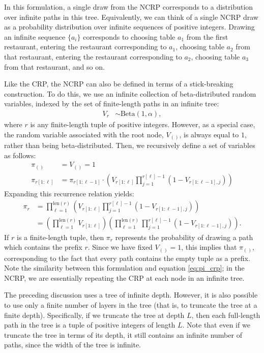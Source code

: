 \documentclass{article}
\newcommand{\len}{\mathrm{len}}
\begin{document}
In this formulation, a single draw from the NCRP corresponds to a distribution over infinite paths in this tree.
Equivalently, we can think of a single NCRP draw as a probability distribution over infinite sequences of positive integers.
Drawing an infinite sequence $\{a_i\}$ corresponds to choosing table $a_1$ from the first restaurant, entering the restaurant corresponding to $a_1$, choosing table $a_2$ from that restaurant, entering the restaurant corresponding to $a_2$, choosing table $a_3$ from that restaurant, and so on.

Like the CRP, the NCRP can also be defined in terms of a stick-breaking construction.
To do this, we use an infinite collection of beta-distributed random variables, indexed by the set of finite-length paths in an infinite tree:
\begin{align*}
V_r &\sim \text{Beta}(1, \alpha),
\end{align*}
where $r$ is any finite-length tuple of positive integers.
However, as a special case, the random variable associated with the root node, $V_{()}$, is always equal to $1$, rather than being beta-distributed.
Then, we recursively define a set of variables as follows:
\begin{align*}
\pi_{()} &= V_{()} = 1 \\
\pi_{r[1:\ell]} &= \pi_{r[1:\ell-1]} \cdot \left( V_{r[1:\ell]} \prod_{j=1}^{r[\ell]-1} (1-V_{r[1:\ell-1],j}) \right)
\end{align*}
Expanding this recurrence relation yields:
\begin{align*}
\pi_r
&= \prod_{\ell = 1}^{\len(r)} \left( V_{r[1:\ell]} \prod_{j=1}^{r[\ell]-1} \left( 1 - V_{r[1:\ell-1],j} \right) \right) \\
&= \left( \prod_{\ell = 1}^{\len(r)} V_{r[1:\ell]} \right) \left( \prod_{\ell = 1}^{\len(r)} \prod_{j=1}^{r[\ell]-1} \left( 1 - V_{r[1:\ell-1],j} \right) \right).
\end{align*}
If $r$ is a finite-length tuple, then $\pi_r$ represents the probability of drawing a path which contains the prefix $r$.
Since we have fixed $V_{()} = 1$, this implies that $\pi_{()}$, corresponding to the fact that every path contains the empty tuple as a prefix.
Note the similarity between this formulation and equation \eqref{eq:pi_crp}; in the NCRP, we are essentially repeating the CRP at each node in an infinite tree.

The preceding discussion uses a tree of infinite depth.
However, it is also possible to use only a finite number of layers in the tree (that is, to truncate the tree at a finite depth).
Specifically, if we truncate the tree at depth $L$, then each full-length path in the tree is a tuple of positive integers of length $L$.
Note that even if we truncate the tree in terms of its depth, it still contains an infinite number of paths, since the width of the tree is infinite.
\end{document}
